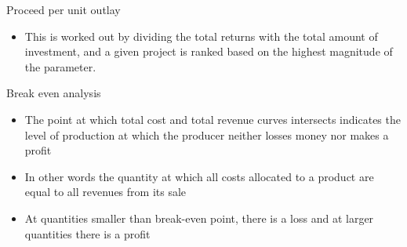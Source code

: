 \documentclass[12pt,ignorenonframetext,aspectratio=169]{beamer}
\providecommand{\tightlist}{%
  \setlength{\itemsep}{0pt}\setlength{\parskip}{0pt}}
\begin{document}
\begin{frame}{Proceed per unit outlay}
\protect\hypertarget{proceed-per-unit-outlay}{}
\begin{itemize}
\tightlist
\item
  This is worked out by dividing the total returns with the total amount
  of investment, and a given project is ranked based on the highest
  magnitude of the parameter.
\end{itemize}
\end{frame}

\begin{frame}{Break even analysis}
\protect\hypertarget{break-even-analysis}{}
\begin{itemize}
\tightlist
\item
  The point at which total cost and total revenue curves intersects
  indicates the level of production at which the producer neither losses
  money nor makes a profit
\item
  In other words the quantity at which all costs allocated to a product
  are equal to all revenues from its sale
\item
  At quantities smaller than break-even point, there is a loss and at
  larger quantities there is a profit
\end{itemize}
\end{frame}
\end{document}
